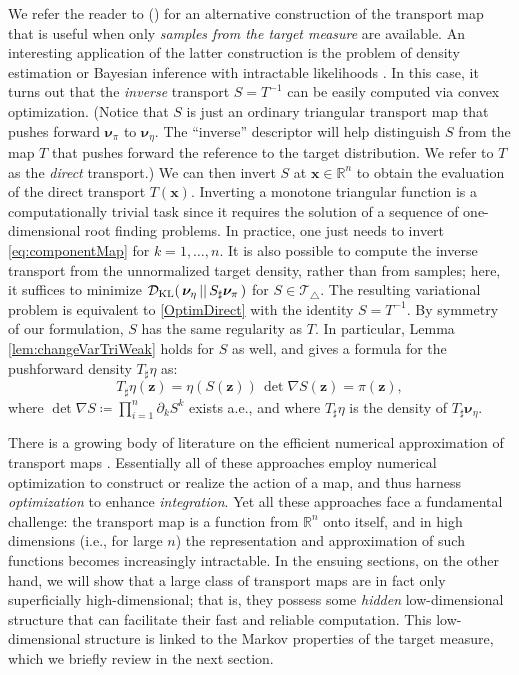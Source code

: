 \documentclass[twoside,11pt]{article}
\newcommand{\push}{_\sharp}                                      %
\newcommand{\genm}{\boldsymbol{\nu} }   %
\newcommand{\re}{\mathbb{R}}
\newcommand{\xb}{\boldsymbol{x}}
\newcommand{\zb}{\boldsymbol{z}}
\newcommand{\Dkl}{\mathcal{D}_{\rm KL}}         %
\newcommand{\spaceMapT}{\mathcal{T}_\triangle}  %
\begin{document}
We refer the reader to
%
%
(\citealp{parno2015transport,parno2014transport}) for an alternative
construction of the transport map that is useful when only \textit{samples
from the target measure} are available.  An interesting application of
the latter construction is the problem of density estimation
%
or Bayesian inference with intractable
%
likelihoods \citep{tabak2013family,Csillery2010}. In
this case, it turns out that the {\it inverse} transport $S = T^{-1}$
can be easily computed via convex optimization.
%
(Notice that $S$ is just an ordinary
triangular transport map that pushes forward $\genm_\pi$ to $\genm_\eta$.  The 
``inverse'' descriptor will help distinguish $S$ from the
map $T$ that pushes forward the reference to the target distribution.  We
refer to $T$ as the {\it direct} transport.)  We can then invert $S$
at $\xb\in\re^n$ to obtain the evaluation of the direct transport
$T(\xb)$.  Inverting a monotone triangular function is a
computationally trivial task since it requires the solution of a
sequence of one-dimensional root finding problems.
%
In practice, one just needs to invert \eqref{eq:componentMap}
for $k=1,\ldots,n$.
It is also possible to compute the
inverse transport from the unnormalized target density, rather than
from samples; here, it suffices to minimize
$\Dkl(\,\genm_{\eta} \,\vert\vert \, S\push \genm_{\pi} \, )$ for
$S\in\spaceMapT$.  The resulting variational problem is equivalent to
\eqref{OptimDirect} with the identity $S=T^{-1}$.
%
By symmetry of our formulation, 
%
$S$ 
has the same regularity as $T$. 
In particular, Lemma \ref{lem:changeVarTriWeak} holds for $S$ as
well, and gives a formula for the pushforward density $T\push \eta$ as:
%
\begin{equation} \label{eq:pushforDensTri}
  T\push \eta(\zb) = \eta(S(\zb))\,\det \nabla S(\zb) = \pi(\zb),
\end{equation}
where $\det \nabla S \coloneqq \prod_{i=1}^n \partial_k S^k$ exists a.e., and
where $T\push \eta$ is the density of $T\push \genm_{\eta}$.
%
%
%

There is a growing body of literature on the efficient numerical approximation
of transport maps 
%
%
\citep[e.g.,][]{rezende2015variational, bigoni2016monotone, mendoza2018bayesian}.
%
%
%
Essentially all of these approaches employ numerical optimization to construct or
realize the action of a map, and thus harness \textit{optimization} to
enhance \textit{integration}.
%
%
%
%
Yet all these approaches face a fundamental challenge: the
transport map is a function from $\re^n$ onto itself, and in high
dimensions (i.e., for large $n$) the representation and approximation
of such functions becomes increasingly intractable.
%
%
%
In the ensuing sections, on the other hand, we will show that a large
class of transport maps are in fact only superficially high-dimensional;
that is, they possess some \textit{hidden} low-dimensional structure
that can facilitate their fast and reliable computation.  This
low-dimensional structure is linked to the Markov properties of the
target measure, which we briefly review
%
%
in the next section.
%
%
%
%
%
%
%
%
%
%
%
%
%
%
%
%
%
%
%
\end{document}
